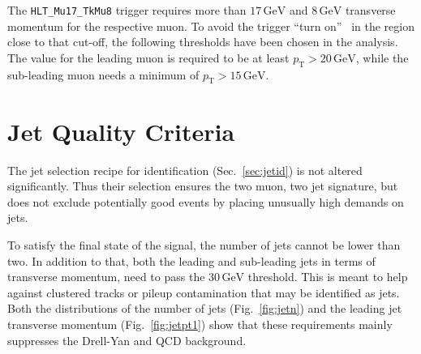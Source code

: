 The \verb+HLT_Mu17_TkMu8+ trigger requires more than $17\,\text{GeV}$ and $8\,\text{GeV}$ transverse momentum for the respective muon. To avoid the trigger ``turn on''~\cite{trigeff} in the region close to that cut-off, the following thresholds have been chosen in the analysis. The value for the leading muon is required to be at least $p_{\text{T}} > 20\,\text{GeV}$, while the sub-leading muon needs a minimum of $p_{\text{T}} > 15\,\text{GeV}$.

\section{Jet Quality Criteria}
\label{sec:jetqualy}

The jet selection recipe for identification (Sec.~\ref{sec:jetid}) is not altered significantly. Thus their selection ensures the two muon, two jet signature, but does not exclude potentially good events by placing unusually high demands on jets.

To satisfy the final state of the signal, the number of jets cannot be lower than two. In addition to that, both the leading and sub-leading jets in terms of transverse momentum, need to pass the $30\,\text{GeV}$ threshold. This is meant to help against clustered tracks or pileup contamination that may be identified as jets. Both the distributions of the number of jets (Fig.~\ref{fig:jetn}) and the leading jet transverse momentum (Fig.~\ref{fig:jetpt1}) show that these requirements mainly suppresses the Drell-Yan and QCD background.

